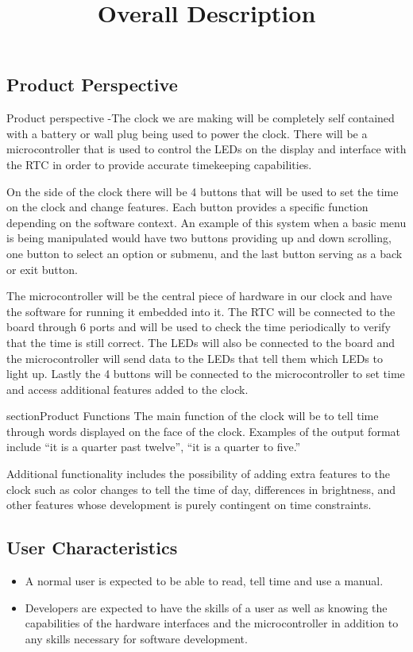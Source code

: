 \documentclass[10pt,draftclsnofoot,onecolumn]{IEEEtran}
\begin{document}
\newpage
\title{Overall Description}
\subsection{Product Perspective}
Product perspective -The clock we are making will be completely self contained with a battery
or wall plug being used to power the clock. There will be a microcontroller that is used to
control the LEDs on the display and interface with the RTC in order to provide accurate
timekeeping capabilities.

On the side of the clock there will be 4 buttons that will be used to set the time on the
clock and change features. Each button provides a specific function depending on the software
context. An example of this system when a basic menu is being manipulated would have two
buttons providing up and down scrolling, one button to select an option or submenu, and the
last button serving as a back or exit button.

The microcontroller will be the central piece of hardware in our clock and have the software
for running it embedded into it. The RTC will be connected to the board through 6 ports and
will be used to check the time periodically to verify that the time is still correct. The LEDs
will also be connected to the board and the microcontroller will send data to the LEDs that
tell them which LEDs to light up. Lastly the 4 buttons will be connected to the
microcontroller to set time and access additional features added to the clock.

\sub section{Product Functions}
The main function of the clock will be to tell time through words displayed on the face of the
clock. Examples of the output format include “it is a quarter past twelve”, “it is a quarter to
five.”

Additional functionality includes the possibility of adding extra features to the clock such as
color changes to tell the time of day, differences in brightness, and other features whose
development is purely contingent on time constraints.

\subsection{User Characteristics}
\begin{itemize}
  \item A normal user is expected to be able to read, tell time and use a manual.
  \item Developers are expected to have the skills of a user as well as knowing the
  capabilities of the hardware interfaces and the microcontroller in addition to any skills
  necessary for software development.
\end{itemize}
\end{document}
